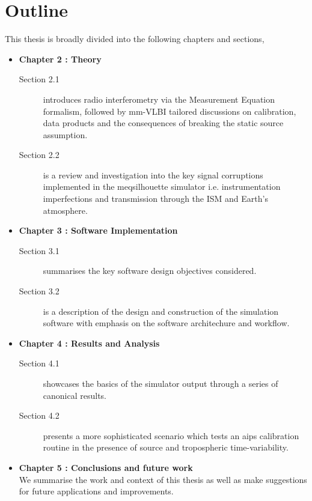 \section{Outline}
This thesis is broadly divided into the following chapters and sections,
\begin{itemize}
 \item {\bf Chapter 2 : Theory} 
 \begin{description}
  \item [Section 2.1] introduces radio interferometry via the Measurement Equation formalism, followed by mm-VLBI tailored discussions on calibration, data products and the consequences of breaking the static source assumption.
  \item [Section 2.2] is a review and investigation into the key signal corruptions implemented in the {\sc meqsilhouette} simulator i.e. instrumentation imperfections and transmission through the ISM and Earth's atmosphere.
 \end{description}

 \item {\bf Chapter 3 : Software Implementation}
 \begin{description}
  \item [Section 3.1] summarises the key software design objectives considered.
  \item [Section 3.2] is a description of the design and construction of the simulation software with emphasis on the software architechure and workflow.
 \end{description}

 
 \item {\bf Chapter 4 : Results and Analysis}
 \begin{description}
  \item  [Section 4.1] showcases the basics of the simulator output through a series of canonical results.
  \item [Section 4.2] presents a more sophisticated scenario which tests an {\sc aips} calibration routine in the presence of source and tropospheric time-variability.
 \end{description}
  
  \item {\bf Chapter 5 : Conclusions and future work}\\
  We summarise the work and context of this thesis as well as make suggestions for future applications and improvements.
 
\end{itemize}

















